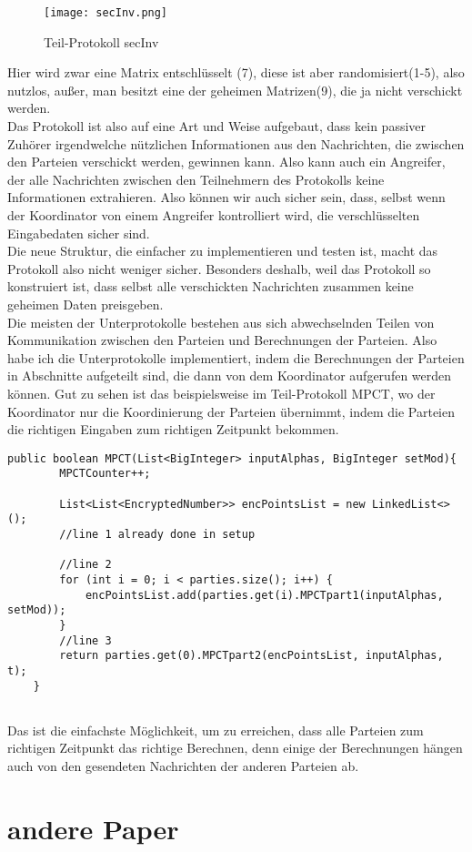 \begin{figure}[h]
\begin{center}
\texttt{[image: secInv.png]}
\caption{Teil-Protokoll secInv}
\cite{Doettling2021}
\label{oInv}
\end{center}

\end{figure}

Hier wird zwar eine Matrix entschlüsselt (7), diese ist aber randomisiert(1-5), also nutzlos, außer, man besitzt eine der geheimen Matrizen(9), die ja nicht verschickt werden.\\
Das Protokoll ist also auf eine Art und Weise aufgebaut, dass kein passiver Zuhörer irgendwelche nützlichen Informationen aus den Nachrichten, die zwischen den Parteien verschickt werden, gewinnen kann. Also kann auch ein Angreifer, der alle Nachrichten zwischen den Teilnehmern des Protokolls keine Informationen extrahieren. Also können wir auch sicher sein, dass, selbst wenn der Koordinator von einem Angreifer kontrolliert wird, die verschlüsselten Eingabedaten sicher sind.\\
Die neue Struktur, die einfacher zu implementieren und testen ist, macht das Protokoll also nicht weniger sicher. Besonders deshalb, weil das Protokoll so konstruiert ist, dass selbst alle verschickten Nachrichten zusammen keine geheimen Daten preisgeben.\\

Die meisten der Unterprotokolle bestehen aus sich abwechselnden Teilen von Kommunikation zwischen den Parteien und Berechnungen der Parteien. Also habe ich die Unterprotokolle implementiert, indem die Berechnungen der Parteien in Abschnitte aufgeteilt sind, die dann von dem Koordinator aufgerufen werden können. Gut zu sehen ist das beispielsweise im Teil-Protokoll MPCT, wo der Koordinator nur die Koordinierung der Parteien übernimmt, indem die Parteien die richtigen Eingaben zum richtigen Zeitpunkt bekommen.\\

\begin{lstlisting}
public boolean MPCT(List<BigInteger> inputAlphas, BigInteger setMod){
        MPCTCounter++;

        List<List<EncryptedNumber>> encPointsList = new LinkedList<>();
        //line 1 already done in setup

        //line 2
        for (int i = 0; i < parties.size(); i++) {
            encPointsList.add(parties.get(i).MPCTpart1(inputAlphas, setMod));
        }
        //line 3
        return parties.get(0).MPCTpart2(encPointsList, inputAlphas, t);
    }


\end{lstlisting}

Das ist die einfachste Möglichkeit, um zu erreichen, dass alle Parteien zum richtigen Zeitpunkt das richtige Berechnen, denn einige der Berechnungen hängen auch von den gesendeten Nachrichten der anderen Parteien ab.\\


\section{andere Paper}
